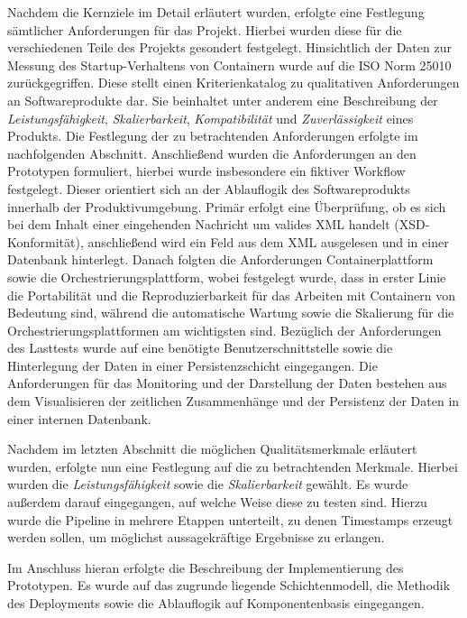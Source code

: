 Nachdem die Kernziele im Detail erläutert wurden, erfolgte eine Festlegung sämtlicher Anforderungen für das Projekt. Hierbei wurden diese für die verschiedenen Teile des Projekts gesondert festgelegt. Hinsichtlich der Daten zur Messung des Startup-Verhaltens von Containern wurde auf die ISO Norm 25010 zurückgegriffen. Diese stellt einen Kriterienkatalog zu qualitativen Anforderungen an Softwareprodukte dar. Sie beinhaltet unter anderem eine Beschreibung der \emph{Leistungsfähigkeit}, \emph{Skalierbarkeit}, \emph{Kompatibilität} und \emph{Zuverlässigkeit} eines Produkts. Die Festlegung der zu betrachtenden Anforderungen erfolgte im nachfolgenden Abschnitt. Anschließend wurden die Anforderungen an den Prototypen formuliert, hierbei wurde insbesondere ein fiktiver Workflow festgelegt. Dieser orientiert sich an der Ablauflogik des Softwareprodukts innerhalb der Produktivumgebung. Primär erfolgt eine Überprüfung, ob es sich bei dem Inhalt einer eingehenden Nachricht um valides XML handelt (XSD-Konformität), anschließend wird ein Feld aus dem XML ausgelesen und in einer Datenbank hinterlegt. Danach folgten die Anforderungen Containerplattform sowie die Orchestrierungsplattform, wobei festgelegt wurde, dass in erster Linie die Portabilität und die Reproduzierbarkeit für das Arbeiten mit Containern von Bedeutung sind, während die automatische Wartung sowie die Skalierung für die Orchestrierungsplattformen am wichtigsten sind. Bezüglich der Anforderungen des Lasttests wurde auf eine benötigte Benutzerschnittstelle sowie die Hinterlegung der Daten in einer Persistenzschicht eingegangen. Die Anforderungen für das Monitoring und der Darstellung der Daten bestehen aus dem Visualisieren der zeitlichen Zusammenhänge und der Persistenz der Daten in einer internen Datenbank.

Nachdem im letzten Abschnitt die möglichen Qualitätsmerkmale erläutert wurden, erfolgte nun eine Festlegung auf die zu betrachtenden Merkmale. Hierbei wurden die \emph{Leistungsfähigkeit} sowie die \emph{Skalierbarkeit} gewählt. Es wurde außerdem darauf eingegangen, auf welche Weise diese zu testen sind. Hierzu wurde die Pipeline in mehrere Etappen unterteilt, zu denen Timestamps erzeugt werden sollen, um möglichst aussagekräftige Ergebnisse zu erlangen. 

Im Anschluss hieran erfolgte die Beschreibung der Implementierung des Prototypen. Es wurde auf das zugrunde liegende Schichtenmodell, die Methodik des Deployments sowie die Ablauflogik auf Komponentenbasis eingegangen. 

